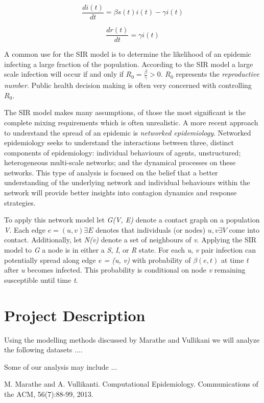 \documentclass[12pt, oneside, openany]{article} %
\begin{document}
\begin{equation}
	\frac{di(t)}{dt} = \beta s(t) i(t) - \gamma i(t)
\end{equation}

\begin{equation}
	\frac{dr(t)}{dt} = \gamma i(t)
\end{equation}

A common use for the SIR model is to determine the likelihood of an epidemic infecting a large fraction of the population. According to the SIR model a large scale infection will occur if and only if \( R_{0} = \frac{\beta}{\gamma} > 0 \). \(R_{0}\) represents the \textit{reproductive number}. Public health decision making is often very concerned with controlling \(R_{0}\).

The SIR model makes many assumptions, of those the most significant is the complete mixing requirements which is often unrealistic. A more recent approach to understand the spread of an epidemic is \textit{networked epidemiology}. Networked epidemiology seeks to understand the interactions between three, distinct components of epidemiology: individual behaviours of agents, unstructured; heterogeneous multi-scale networks; and the dynamical processes on these networks. This type of analysis is focused on the belief that a better understanding of the underlying network and individual behaviours within the network will provide better insights into contagion dynamics and response strategies. 

To apply this network model let \textit{G(V, E)} denote a contact graph on a population \textit{V}. Each edge \( e=(u,v) \exists E \) denotes that individuals (or nodes) \(u, v \exists V \) come into contact. Additionally, let \textit{N(v)} denote a set of neighbours of \textit{v}. Applying the SIR model to \textit{G} a node is in either a \textit{S}, \textit{I}, or \textit{R} state. For each \textit{u}, \textit{v} pair infection can potentially spread along edge \textit{e = (u, v)} with probability of \( \beta(e,t) \) at time \textit{t} after \textit{u} becomes infected. This probability is conditional on node \textit{v} remaining susceptible until time \textit{t}. 

\section{Project Description}
Using the modelling methods discussed by Marathe and Vullikani we will analyze the following datasets ....

Some of our analysis may include ...

\newpage
\begin{thebibliography}{1}
  M. Marathe and A. Vullikanti. Computational Epidemiology. Communications of the ACM, 56(7):88-99, 2013. \end{thebibliography}
\end{document}

